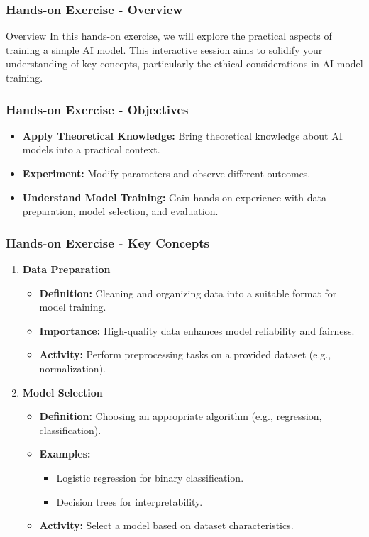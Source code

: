 \documentclass{beamer}
\begin{document}
\begin{frame}[fragile]
    \frametitle{Hands-on Exercise - Overview}
    \begin{block}{Overview}
        In this hands-on exercise, we will explore the practical aspects of training a simple AI model. 
        This interactive session aims to solidify your understanding of key concepts, particularly the ethical considerations in AI model training.
    \end{block}
\end{frame}

\begin{frame}[fragile]
    \frametitle{Hands-on Exercise - Objectives}
    \begin{itemize}
        \item \textbf{Apply Theoretical Knowledge:} 
        Bring theoretical knowledge about AI models into a practical context.
        \item \textbf{Experiment:} 
        Modify parameters and observe different outcomes.
        \item \textbf{Understand Model Training:} 
        Gain hands-on experience with data preparation, model selection, and evaluation.
    \end{itemize}
\end{frame}

\begin{frame}[fragile]
    \frametitle{Hands-on Exercise - Key Concepts}
    \begin{enumerate}
        \item \textbf{Data Preparation}
            \begin{itemize}
                \item \textbf{Definition:} Cleaning and organizing data into a suitable format for model training.
                \item \textbf{Importance:} High-quality data enhances model reliability and fairness.
                \item \textbf{Activity:} Perform preprocessing tasks on a provided dataset (e.g., normalization).
            \end{itemize}

        \item \textbf{Model Selection}
            \begin{itemize}
                \item \textbf{Definition:} Choosing an appropriate algorithm (e.g., regression, classification).
                \item \textbf{Examples:} 
                    \begin{itemize}
                        \item Logistic regression for binary classification.
                        \item Decision trees for interpretability.
                    \end{itemize}
                \item \textbf{Activity:} Select a model based on dataset characteristics.
            \end{itemize}
    \end{enumerate}
\end{frame}
\end{document}
